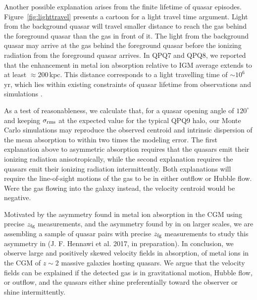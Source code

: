 \documentclass[iop]{emulateapj}
\begin{document}
Another possible explanation arises from the finite lifetime of quasar episodes. 
Figure~\ref{fig:lighttravel} presents a cartoon for a light travel time argument. Light from the 
background quasar will travel smaller distance to reach the gas behind the foreground quasar 
than the gas in front of it. The light from the background quasar may arrive at the gas behind 
the foreground quasar before the ionizing radiation from the foreground quasar arrives. In 
QPQ7 and QPQ8, we reported that the enhancement in metal ion absorption relative to IGM average 
extends to at least $\approx200$\,kpc. This distance corresponds to a light travelling time of 
$\sim10^6$\,yr, which lies within existing constraints of quasar lifetime from observations 
\citep[e.g.][]{Martini04} and simulations \citep[e.g.][]{Hopkins+05}. 

As a test of reasonableness, we calculate that, for a quasar opening angle of $120^\circ$ and
keeping $\sigma_{\rm rms}$ at the expected value for the typical QPQ9 halo, our Monte Carlo
simulations may reproduce the observed centroid and intrinsic dispersion of the  mean
absorption to within two times the modeling error.
The first explanation above to asymmetric
absorption requires that the quasars emit their ionizing radiation anisotropically, while the 
second explanation requires the quasars emit their ionizing radiation intermittently. Both 
explanations will require the line-of-sight motions of the gas to be in either outflow or Hubble 
flow. Were the gas flowing into the galaxy instead, the velocity centroid would be negative. 

Motivated by the asymmetry found in metal ion absorption in the CGM using precise $z_{\rm fg}$ 
measurements, and the asymmetry found by \cite{KirkmanTytler08} in  on larger 
scales, we are assembling a sample of quasar pairs with precise $z_{\rm fg}$ measurements to study 
this asymmetry in  (J. F. Hennawi et al. 2017, in preparation). In conclusion, we 
observe large and positively skewed velocity fields in absorption, of metal ions 
in the CGM of $z\sim2$ massive galaxies hosting quasars. We argue that the velocity fields can be 
explained if the detected gas is in gravitational motion, Hubble flow, or outflow, and the quasars 
either shine preferentially toward the observer or shine intermittently. 
\end{document}
